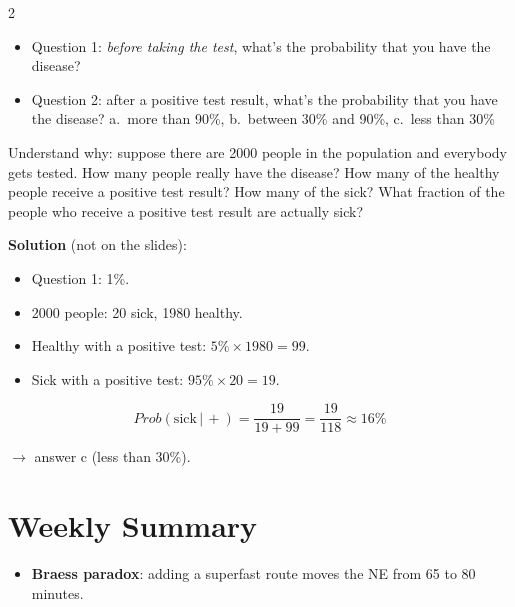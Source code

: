 \documentclass[a4paper,9pt]{extarticle}
\begin{document}
\begin{multicols}{2}
\begin{example}
\begin{itemize}
\item Question 1: \emph{before taking the test}, what's the probability that you have the
disease?

\item Question 2: after a positive test result, what's the probability that you have the
disease? a.\ more than 90\%, b.\ between 30\% and 90\%, c.\ less than 30\%

\end{itemize}

Understand why: suppose there are 2000 people in the population and everybody gets tested.
How many people really have the disease? How many of the healthy people receive a positive
test result? How many of the sick? What fraction of the people who receive a positive test
result are actually sick?

\textbf{Solution} (not on the slides):

\begin{itemize}

\item Question 1: 1\%.

\item 2000 people: 20 sick, 1980 healthy.

\item Healthy with a positive test: $5\% \times 1980 = 99$.

\item Sick with a positive test: $95\% \times 20 = 19$.

\end{itemize}

\[
Prob(\text{sick} \,|\, +) = \frac{19}{19 + 99} = \frac{19}{118} \approx 16\%
\]

$\rightarrow$ answer c (less than 30\%).

\end{example}



\section{Weekly Summary}


\begin{summary}

\begin{itemize}

\item \textbf{Braess paradox}: adding a superfast route moves the NE from 65 to 80 minutes.


\end{itemize}
\end{summary}
\end{multicols}
\end{document}
